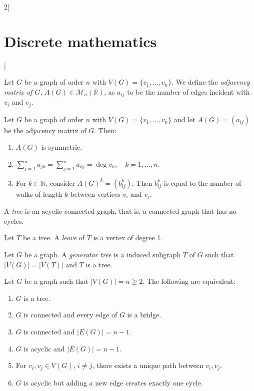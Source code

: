 \documentclass[../../../main.tex]{subfiles}
\begin{document}
\begin{multicols}{2}[\section{Discrete mathematics}]
\begin{definition}
Let $G$ be a graph of order $n$ with $V(G)=\{v_1,\ldots,v_n\}$. We define the \textit{adjacency matrix of $G$}, $A(G)\in\mathcal{M}_n(\mathbb{R})$, as $a_{ij}$ to be the number of edges incident with $v_i$ and $v_j$.
\end{definition}
\begin{prop}
Let $G$ be a graph of order $n$ with $V(G)=\{v_1,\ldots,v_n\}$ and let $A(G)=(a_{ij})$ be the adjacency matrix of $G$. Then:
\begin{enumerate}
    \item $A(G)$ is symmetric.
    \item $\displaystyle\sum_{j=1}^n a_{jk}=\sum_{j=1}^n a_{kj}=\deg v_k,\quad k=1,\ldots,n$.
    \item For $k\in\mathbb{N}$, consider $A(G)^k=(b_{ij}^k)$. Then $b_{ij}^k$ is equal to the number of walks of length $k$ between vertices $v_i$ and $v_j$.
\end{enumerate}
\end{prop}
\begin{definition}
A \textit{tree} is an acyclic connected graph, that is, a connected graph that has no cycles.
\end{definition}
\begin{definition}
Let $T$ be a tree. A \textit{leave} of $T$ is a vertex of degree 1.
\end{definition}
\begin{definition}
Let $G$ be a graph. A \textit{generator tree} is a induced subgraph $T$ of $G$ such that $|V(G)|=|V(T)|$ and $T$ is a tree.
\end{definition}
\begin{prop}
Let $G$ be a graph such that $|V(G)|=n\geq 2$. The following are equivalent:
\begin{enumerate}
    \item $G$ is a tree.
    \item $G$ is connected and every edge of $G$ is a bridge.
    \item $G$ is connected and $|E(G)|=n-1$.
    \item $G$ is acyclic and $|E(G)|=n-1$.
    \item For $v_i,v_j\in V(G)$, $i\ne j$, there exists a unique path between $v_i,v_j$. 
    \item $G$ is acyclic but adding a new edge creates exactly one cycle.
\end{enumerate}
\end{prop}
\begin{definition}

\end{definition}
\end{multicols}
\end{document}
